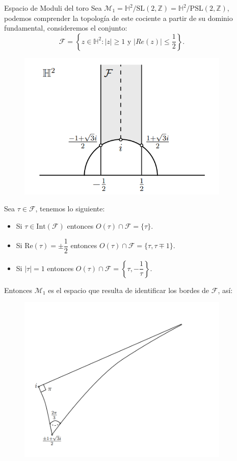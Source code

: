 \documentclass[final]{beamer}
\newcommand\Z{\ensuremath{\mathbb{Z}}}
\newcommand\Hs{\ensuremath{\mathbb{H}}}
\newlength{\sepwidth}
\newlength{\colwidth}
\newcommand{\separatorcolumn}{\begin{column}{\sepwidth}\end{column}}
\begin{document}
\begin{frame}[t,fragile]
\begin{columns}[t]
\begin{column}{\colwidth}
\end{column}

\separatorcolumn

\begin{column}{\colwidth}
\begin{block}{Espacio de Moduli del toro}
Sea $\mathcal{M}_1 = \Hs^2/\text{SL}(2,\Z) = \Hs^2/\text{PSL}(2,\Z)$, podemos comprender la topología de este cociente a partir de su dominio fundamental, consideremos el conjunto:
    $$\mathcal{F}=\left\{z\in\Hs^2:|z|\geq 1\text{ y } |Re(z)|\leq \frac{1}{2}\right\}.$$
    \begin{figure}
            \centering
            \includegraphics[width=0.7\linewidth]{Imagenes/FunDom.png}
        \end{figure} 
Sea $\tau \in \mathcal{F}$, tenemos lo siguiente:
\begin{itemize}
        \item Si $\tau\in \text{Int}(\mathcal{F})$ entonces $O(\tau)\cap\mathcal{F}=\{\tau\}.$ 
        \item Si $\text{Re}(\tau)=\pm\dfrac{1}{2}$ entonces $O(\tau)\cap\mathcal{F}=\{\tau,\tau\mp1\}.$
        \item Si $|\tau|=1$ entonces $O(\tau)\cap \mathcal{F}=\left\{\tau,-\dfrac{1}{\tau}\right\}.$
    \end{itemize}
Entonces $\mathcal{M}_1$ es el espacio que resulta de identificar los bordes de $\mathcal{F}$, así:
    \begin{figure}
            \centering
            \includegraphics[width=0.7\linewidth]{Imagenes/Empanada.png}
        \end{figure} 


\end{block}
\end{column}
\end{columns}
\end{frame}
\end{document}
